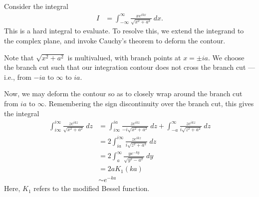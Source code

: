 \documentclass[10pt]{mypackage}
\begin{document}
\begin{example}
  Consider the integral
  \begin{align*}
    I &= \int_{-\infty}^{\infty} \frac{xe^{ikx}}{\sqrt{x^2 + a^2}}\:dx.
  \end{align*}
  This is a hard integral to evaluate. To resolve this, we extend the integrand to the complex plane, and invoke Cauchy's theorem to deform the contour.\newline

  Note that $\sqrt{x^2 + a^2}$ is multivalued, with branch points at $x = \pm ia$. We choose the branch cut such that our integration contour does not cross the branch cut --- i.e., from $-ia$ to $\infty$ to $ia$.\newline

  Now, we may deform the contour so as to closely wrap around the branch cut from $ia$ to $\infty$. Remembering the sign discontinuity over the branch cut, this gives the integral
  \begin{align*}
    \int_{i\infty}^{i\infty} \frac{ze^{ikz}}{\sqrt{x^2 + a^2}}\:dz &= \int_{i\infty}^{ia} \frac{ze^{ikz}}{-i\sqrt{x^2 + a^2}}\:dz + \int_{-a}^{\infty} \frac{ze^{ikz}}{i\sqrt{z^2 + a^2}}\:dz\\
                                                                   &= 2\int_{ia}^{i\infty} \frac{ze^{ikz}}{i\sqrt{z^2 + a^2}}\:dz\\
                                                                   &= 2\int_{a}^{\infty} \frac{ye^{-ky}}{\sqrt{y^2 - a^2}}\:dy\tag*{$z = iy$}\\
                                                                   &= 2aK_1\left( ka \right)\\
                                                                   &\sim e^{-ka}
  \end{align*}
  Here, $K_1$ refers to the modified Bessel function.
\end{example}
\end{document}
